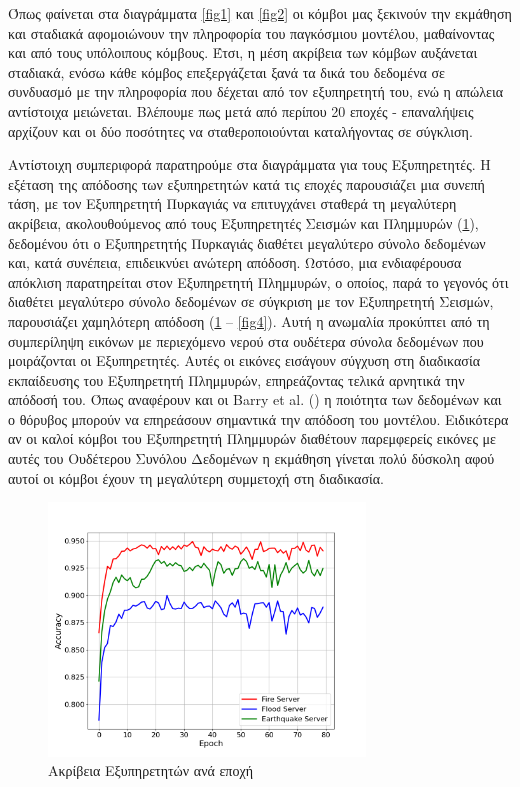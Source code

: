 \newpage

Όπως φαίνεται στα διαγράμματα \ref{fig1} και \ref{fig2} οι κόμβοι μας ξεκινούν την εκμάθηση και σταδιακά αφομοιώνουν την πληροφορία του παγκόσμιου μοντέλου, μαθαίνοντας και από τους υπόλοιπους κόμβους. Έτσι, η μέση ακρίβεια των κόμβων αυξάνεται σταδιακά, ενόσω κάθε κόμβος επεξεργάζεται ξανά τα δικά του δεδομένα σε συνδυασμό με την πληροφορία που δέχεται από τον εξυπηρετητή του, ενώ η απώλεια αντίστοιχα μειώνεται. Βλέπουμε πως μετά από περίπου 20 εποχές - επαναλήψεις αρχίζουν και οι δύο ποσότητες να σταθεροποιούνται καταλήγοντας σε σύγκλιση.

Αντίστοιχη συμπεριφορά παρατηρούμε στα διαγράμματα για τους Εξυπηρετητές. Η εξέταση της απόδοσης των εξυπηρετητών κατά τις εποχές παρουσιάζει μια συνεπή τάση, με τον Εξυπηρετητή Πυρκαγιάς να επιτυγχάνει σταθερά τη μεγαλύτερη ακρίβεια, ακολουθούμενος από τους Εξυπηρετητές Σεισμών και Πλημμυρών (\ref{fig3}), δεδομένου ότι ο Εξυπηρετητής Πυρκαγιάς διαθέτει μεγαλύτερο σύνολο δεδομένων και, κατά συνέπεια, επιδεικνύει ανώτερη απόδοση. Ωστόσο, μια ενδιαφέρουσα απόκλιση παρατηρείται στον Εξυπηρετητή Πλημμυρών, ο οποίος, παρά το γεγονός ότι διαθέτει μεγαλύτερο σύνολο δεδομένων σε σύγκριση με τον Εξυπηρετητή Σεισμών, παρουσιάζει χαμηλότερη απόδοση (\ref{fig3} – \ref{fig4}). Αυτή η ανωμαλία προκύπτει από τη συμπερίληψη εικόνων με περιεχόμενο νερού στα ουδέτερα σύνολα δεδομένων που μοιράζονται οι Εξυπηρετητές. Αυτές οι εικόνες εισάγουν σύγχυση στη διαδικασία εκπαίδευσης του Εξυπηρετητή Πλημμυρών, επηρεάζοντας τελικά αρνητικά την απόδοσή του. Όπως αναφέρουν και οι Barry et al. () η ποιότητα των δεδομένων και ο θόρυβος μπορούν να επηρεάσουν σημαντικά την απόδοση του μοντέλου. Ειδικότερα αν οι καλοί κόμβοι του Εξυπηρετητή Πλημμυρών διαθέτουν παρεμφερείς εικόνες με αυτές του Ουδέτερου Συνόλου Δεδομένων η εκμάθηση γίνεται πολύ δύσκολη αφού αυτοί οι κόμβοι έχουν τη μεγαλύτερη συμμετοχή στη διαδικασία.

\begin{figure}[ht]
    \centering
    \includegraphics[width=0.75\textwidth]{figures/chapter2/Server_Accuracies.png}
    \caption{Ακρίβεια Εξυπηρετητών ανά εποχή}
    \label{fig3}
\end{figure}


